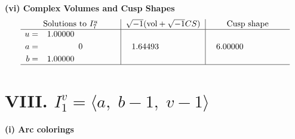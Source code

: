 \documentclass[1p]{elsarticle_modified}
\theoremstyle{definition}
\newcommand{\I}{\sqrt{-1}}
\begin{document}
\newpage\flushleft \textbf{(vi) Complex Volumes and Cusp Shapes}
$$\begin{array}{c|c|c}  
\text{Solutions to }I^u_{7}& \I (\text{vol} + \sqrt{-1}CS) & \text{Cusp shape}\\
 \hline 
\begin{aligned}
u &= \phantom{-}1.00000\phantom{ +0.000000I} \\
a &= \phantom{-0.000000 } 0 \\
b &= \phantom{-}1.00000\phantom{ +0.000000I}\end{aligned}
 & \phantom{-}1.64493\phantom{ +0.000000I} & \phantom{-}6.00000\phantom{ +0.000000I}\\
 \hline 
 \end{array}$$\newpage\newpage\renewcommand{\arraystretch}{1}
\centering \section*{VIII. $I^v_{1}= \langle a,\;b-1,\;v-1 \rangle$}
\flushleft \textbf{(i) Arc colorings}\\
\end{document}
